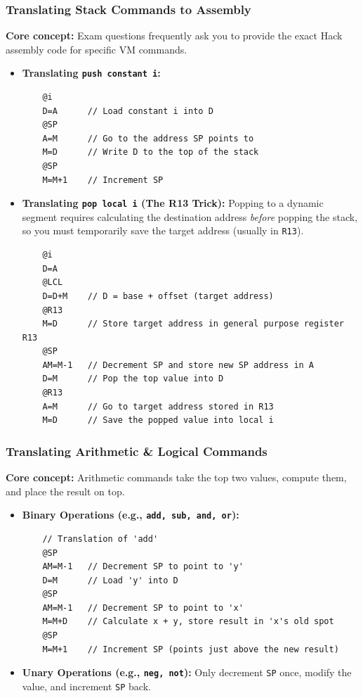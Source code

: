 \documentclass[12pt,a4paper]{article}
\begin{document}
\subsubsection*{Translating Stack Commands to Assembly}
\textbf{Core concept:} Exam questions frequently ask you to provide the exact Hack assembly code for specific VM commands.
\begin{itemize}
    \item \textbf{Translating \texttt{push constant i}:}
    \begin{verbatim}
    @i
    D=A      // Load constant i into D
    @SP
    A=M      // Go to the address SP points to
    M=D      // Write D to the top of the stack
    @SP
    M=M+1    // Increment SP
    \end{verbatim}
    \item \textbf{Translating \texttt{pop local i} (The R13 Trick):} Popping to a dynamic segment requires calculating the destination address \textit{before} popping the stack, so you must temporarily save the target address (usually in \texttt{R13}).
    \begin{verbatim}
    @i
    D=A
    @LCL
    D=D+M    // D = base + offset (target address)
    @R13
    M=D      // Store target address in general purpose register R13
    @SP
    AM=M-1   // Decrement SP and store new SP address in A
    D=M      // Pop the top value into D
    @R13
    A=M      // Go to target address stored in R13
    M=D      // Save the popped value into local i
    \end{verbatim}
\end{itemize}

\subsubsection*{Translating Arithmetic \& Logical Commands}
\textbf{Core concept:} Arithmetic commands take the top two values, compute them, and place the result on top.
\begin{itemize}
    \item \textbf{Binary Operations (e.g., \texttt{add, sub, and, or}):}
    \begin{verbatim}
    // Translation of 'add'
    @SP
    AM=M-1   // Decrement SP to point to 'y'
    D=M      // Load 'y' into D
    @SP
    AM=M-1   // Decrement SP to point to 'x'
    M=M+D    // Calculate x + y, store result in 'x's old spot
    @SP
    M=M+1    // Increment SP (points just above the new result)
    \end{verbatim}
    \item \textbf{Unary Operations (e.g., \texttt{neg, not}):} Only decrement \texttt{SP} once, modify the value, and increment \texttt{SP} back.
\end{itemize}
\end{document}
